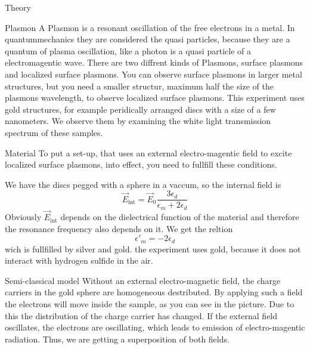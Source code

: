 \documentclass[pdftex, a4paper,11pt, twoside, ngerman]{report}
\begin{document}
  \begin{chapter}{Theory}
    \label{chp:Theorie}
    
    \begin{section}{Plasmon}
        A Plasmon is a resonant oscillation of the free electrons in a metal.
        In quantummechanics they are considered the quasi particles, because they are a quantum of plasma oscillation, like a photon is a quasi particle of a electromagentic wave.
        There are two diffrent kinds of Plasmons, surface plasmons and localized surface plasmons.
        You can observe surface plasmons in larger metal structures, but you need a smaller structur, maximum half the size of the plasmons wavelength, to observe localized surface plasmons.  
        This experiment uses gold structures, for example peridically arranged discs with a size of a few nanometers.
        We observe them by examining the white light transmission spectrum of these samples.

    \end{section}
    
    \begin{section}{Material}
        To put a set-up, that uses an external electro-magentic field to excite localized surface plasmons, into effect, you need to fullfill these conditions.

        We have the discs pegged with a sphere in a vaccum, so the internal field is
        \[
            \vec{E}_\text{int} = \vec E_0\frac{3\epsilon_d}{\epsilon_m+2\epsilon_d}
        \]
        Obviously $\vec E_\text{int}$ depends on the dielectrical function of the material and therefore the resonance frequency also depends on it.
        We get the reltion
        \[
            \epsilon'_m = -2\epsilon_d
        \]
        wich is fullfilled by silver and gold.
        the experiment uses gold, because it does not interact with hydrogen sulfide in the air.

    \end{section}

    \begin{section}{Semi-classical model}
        Without an external electro-magnetic field, the charge carriers in the gold sphere are homogeneous destributed.
        By applying such a field the electrons will move inside the sample, as you can see in the picture. 
        Due to this the distribution of the charge carrier has changed.
        If the external field oscillates, the electrons are oscillating, which leads to emission of electro-magentic radiation.
        Thus, we are getting a superposition of both fields.


\end{section}
\end{chapter}
\end{document}
